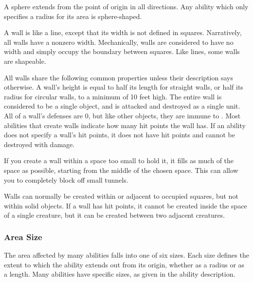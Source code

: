              A sphere extends from the point of origin in all directions.
            Any ability which only specifies a radius for its area is sphere-shaped.

             A wall is like a line, except that its width is not defined in squares.
            Narratively, all walls have a nonzero width.
            Mechanically, walls are considered to have no width and simply occupy the boundary between squares.
            Like lines, some walls are shapeable.

            All walls share the following common properties unless their description says otherwise.
            A wall's height is equal to half its length for straight walls, or half its radius for circular walls, to a minimum of 10 feet high.
            The entire wall is considered to be a single object, and is attacked and destroyed as a single unit.
            All of a wall's defenses are 0, but like other objects, they are immune to .
            Most abilities that create walls indicate how many hit points the wall has.
            If an ability does not specify a wall's hit points, it does not have hit points and cannot be destroyed with damage.

            If you create a wall within a space too small to hold it, it fills as much of the space as possible, starting from the middle of the chosen space.
            This can allow you to completely block off small tunnels.

            Walls can normally be created within or adjacent to occupied squares, but not within solid objects.
            If a wall has hit points, it cannot be created inside the space of a single creature, but it can be created between two adjacent creatures.


        \subsubsection{Area Size}

            The area affected by many abilities falls into one of six sizes.
            Each size defines the extent to which the ability extends out from its origin, whether as a radius or as a length.
            Many abilities have specific sizes, as given in the ability description.

